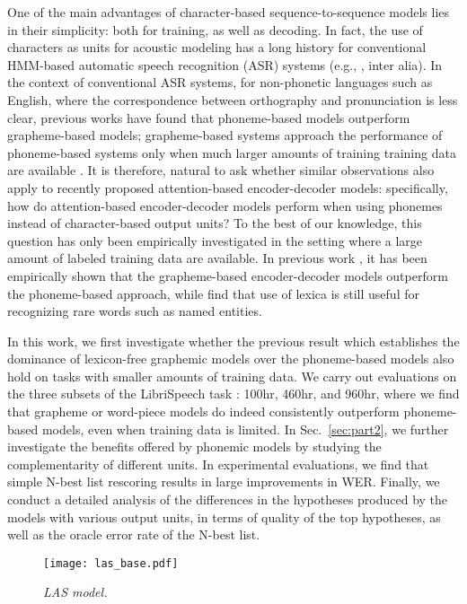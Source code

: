 \documentclass[a4paper]{article}
\begin{document}
One of the main advantages of character-based sequence-to-sequence models lies in their simplicity:
both for training, as well as decoding. 
In fact, the use of characters as units for acoustic modeling has a long history for conventional
HMM-based automatic speech recognition (ASR) systems (e.g., \cite{kanthak02, KillerSS03, SungHBS09}, inter alia).
In the context of conventional ASR systems, for non-phonetic languages such as English, where the correspondence between orthography and pronunciation is less clear, previous works \cite{kanthak02, KillerSS03} have found that phoneme-based models outperform grapheme-based models; grapheme-based systems approach the performance of phoneme-based systems only when much larger amounts of training training data are available \cite{SungHBS09}.
It is therefore, natural to ask whether similar observations also apply to recently proposed attention-based encoder-decoder models: specifically, how do attention-based encoder-decoder models perform when using phonemes instead of character-based output units? 
To the best of our knowledge, this question has only been empirically investigated in the setting where a large amount of labeled training data are available. In previous work \cite{sainath2017no, zhou2018comparison}, it has been empirically shown that the grapheme-based encoder-decoder models outperform the phoneme-based approach, while \cite{sainath2017no} find that use of lexica is still useful for recognizing rare words such as named entities. 

In this work, we first investigate whether the previous result \cite{sainath2017no} which establishes the dominance of lexicon-free graphemic models over the phoneme-based models also hold on tasks with smaller amounts of training data.
We carry out evaluations on the three subsets of the LibriSpeech task \cite{panayotov2015librispeech}: 100hr, 460hr, and 960hr, where we find that grapheme or word-piece models do indeed consistently outperform phoneme-based models, even when training data is limited.
In Sec.~\ref{sec:part2}, we further investigate the benefits offered by phonemic models by studying the complementarity of different units. In experimental evaluations, we find that simple N-best list rescoring results in large improvements in WER. Finally, we conduct a detailed analysis of the differences in the hypotheses produced by the models with various output units, in terms of quality of the top hypotheses, as well as the oracle error rate of the N-best list.
\begin{figure}[b]
	\vspace{-5mm}
	\centerline{\texttt{[image: las\_base.pdf]}}
\caption{\it LAS model.}
	\label{fig:las_base}
\end{figure}
\vspace{-2mm}
\end{document}
